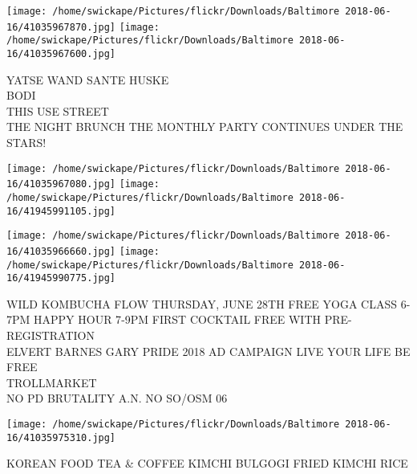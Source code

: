 \documentclass[10pt,letterpaper]{article}
\begin{document}
\texttt{[image: /home/swickape/Pictures/flickr/Downloads/Baltimore 2018-06-16/41035967870.jpg]}
\texttt{[image: /home/swickape/Pictures/flickr/Downloads/Baltimore 2018-06-16/41035967600.jpg]}

YATSE WAND SANTE HUSKE\\
BODI\\
THIS USE STREET\\
THE NIGHT BRUNCH THE MONTHLY PARTY CONTINUES UNDER THE STARS!
\pagebreak

\texttt{[image: /home/swickape/Pictures/flickr/Downloads/Baltimore 2018-06-16/41035967080.jpg]}
\texttt{[image: /home/swickape/Pictures/flickr/Downloads/Baltimore 2018-06-16/41945991105.jpg]}

\texttt{[image: /home/swickape/Pictures/flickr/Downloads/Baltimore 2018-06-16/41035966660.jpg]}
\texttt{[image: /home/swickape/Pictures/flickr/Downloads/Baltimore 2018-06-16/41945990775.jpg]}

WILD KOMBUCHA FLOW THURSDAY, JUNE 28TH FREE YOGA CLASS 6{-}7PM HAPPY HOUR 7{-}9PM FIRST COCKTAIL FREE WITH PRE{-}REGISTRATION\\
ELVERT BARNES GARY PRIDE 2018 AD CAMPAIGN LIVE YOUR LIFE BE FREE\\
TROLLMARKET\\
NO PD BRUTALITY A.N. NO SO/OSM 06
\pagebreak

\texttt{[image: /home/swickape/Pictures/flickr/Downloads/Baltimore 2018-06-16/41035975310.jpg]}

KOREAN FOOD TEA \& COFFEE KIMCHI BULGOGI FRIED KIMCHI RICE
\pagebreak
\end{document}
